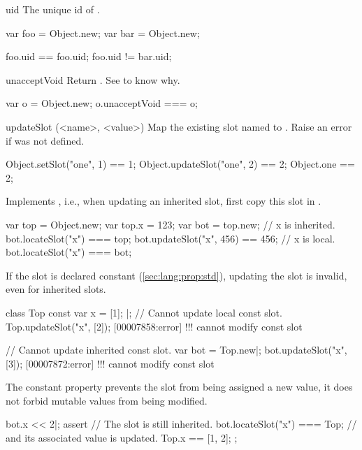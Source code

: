 \begin{urbiscriptapi}
\item[uid]
  The unique id of \this.
\begin{urbiassert}
var foo = Object.new;
var bar = Object.new;

foo.uid == foo.uid;
foo.uid != bar.uid;
\end{urbiassert}

\item[unacceptVoid]%
  Return \this.  See  to know why.
\begin{urbiassert}
var o = Object.new;
o.unacceptVoid === o;
\end{urbiassert}

\item[updateSlot](<name>, <value>)%
  Map the existing slot named  to . Raise an
  error if  was not defined.
\begin{urbiassert}
Object.setSlot("one", 1)    == 1;
Object.updateSlot("one", 2) == 2;
Object.one                  == 2;
\end{urbiassert}

  Implements , i.e., when updating an inherited slot,
  first copy this slot in \this.

\begin{urbiassert}
var top = Object.new;
var top.x = 123;
var bot = top.new;
// x is inherited.
bot.locateSlot("x") === top;
bot.updateSlot("x", 456) == 456;
// x is local.
bot.locateSlot("x") === bot;
\end{urbiassert}

  If the slot is declared constant (\autoref{sec:lang:prop:std}), updating
  the slot is invalid, even for inherited slots.

\begin{urbiscript}
class Top
{
  const var x = [1];
}|;
// Cannot update local const slot.
Top.updateSlot("x", [2]);
[00007858:error] !!! cannot modify const slot

// Cannot update inherited const slot.
var bot = Top.new|;
bot.updateSlot("x", [3]);
[00007872:error] !!! cannot modify const slot
\end{urbiscript}

  The constant property prevents the slot from being assigned a new value,
  it does not forbid mutable values from being modified.

\begin{urbiscript}
bot.x << 2|;
assert
{
  // The slot is still inherited.
  bot.locateSlot("x") === Top;
  // and its associated value is updated.
  Top.x == [1, 2];
};
\end{urbiscript}


\end{urbiscriptapi}
